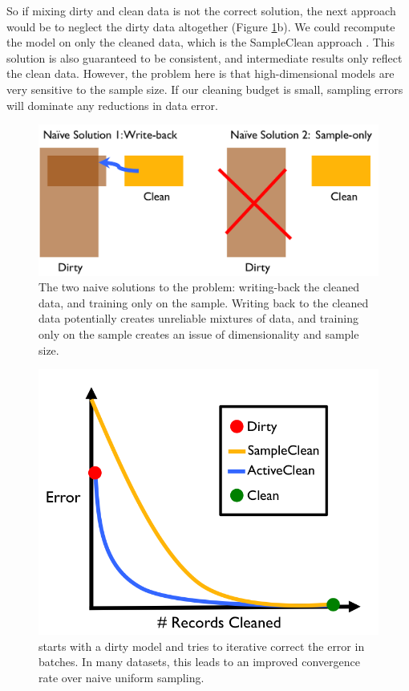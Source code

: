 So if mixing dirty and clean data is not the correct solution, the next approach would be to neglect the dirty data altogether (Figure \ref{update-arch1}b).
We could recompute the model on only the cleaned data, which is the SampleClean approach \cite{wang1999sample}.
This solution is also guaranteed to be consistent, and intermediate results only reflect the clean data.
However, the problem here is that high-dimensional models are very sensitive to the sample size.
If our cleaning budget is small, sampling errors will dominate any reductions in data error.

\begin{figure}[ht!]
\centering
 \includegraphics[width=\columnwidth]{figs/update-arch.png}
 \caption{The two naive solutions to the problem: writing-back the cleaned data, and training only on the sample. Writing back to the cleaned data potentially creates unreliable mixtures of data, and training only on the sample creates an issue of dimensionality and sample size. \label{update-arch1}}
\end{figure}

\vspace{0.5em}

\begin{figure}[t]
\centering
 \includegraphics[width=0.6\columnwidth]{figs/arch2.png}
 \caption{\sysfull starts with a dirty model and tries to iterative correct the error in batches. In many datasets, this leads to an improved convergence rate over naive uniform sampling. \label{sys-arch2}}
\end{figure}

